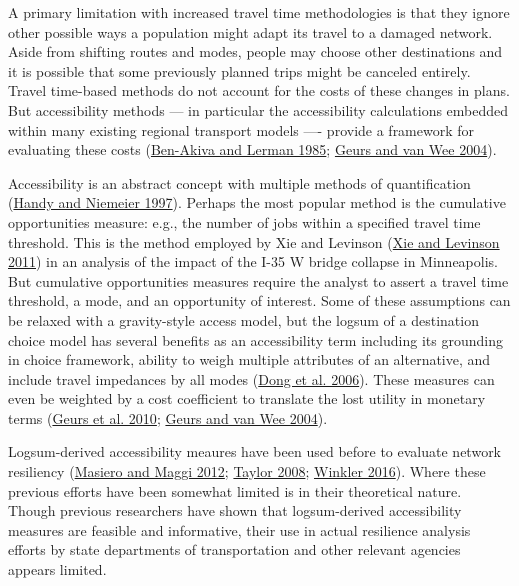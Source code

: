 \documentclass[]{ascelike-new}
\begin{document}
A primary limitation with increased travel time methodologies is that
they ignore other possible ways a population might adapt its travel to a
damaged network. Aside from shifting routes and modes, people may choose
other destinations and it is possible that some previously planned trips
might be canceled entirely. Travel time-based methods do not account for
the costs of these changes in plans. But accessibility methods --- in
particular the accessibility calculations embedded within many existing
regional transport models ---- provide a framework for evaluating these
costs (\protect\hyperlink{ref-ben-akiva1985}{Ben-Akiva and Lerman 1985};
\protect\hyperlink{ref-geurs2004}{Geurs and van Wee 2004}).

Accessibility is an abstract concept with multiple methods of
quantification (\protect\hyperlink{ref-handy1997}{Handy and Niemeier
1997}). Perhaps the most popular method is the cumulative opportunities
measure: e.g., the number of jobs within a specified travel time
threshold. This is the method employed by Xie and Levinson
(\protect\hyperlink{ref-xie2011}{Xie and Levinson 2011}) in an analysis
of the impact of the I-35 W bridge collapse in Minneapolis. But
cumulative opportunities measures require the analyst to assert a travel
time threshold, a mode, and an opportunity of interest. Some of these
assumptions can be relaxed with a gravity-style access model, but the
logsum of a destination choice model has several benefits as an
accessibility term including its grounding in choice framework, ability
to weigh multiple attributes of an alternative, and include travel
impedances by all modes (\protect\hyperlink{ref-dong2006}{Dong et al.
2006}). These measures can even be weighted by a cost coefficient to
translate the lost utility in monetary terms
(\protect\hyperlink{ref-geurs2010}{Geurs et al. 2010};
\protect\hyperlink{ref-geurs2004}{Geurs and van Wee 2004}).

Logsum-derived accessibility meaures have been used before to evaluate
network resiliency (\protect\hyperlink{ref-masiero2012}{Masiero and
Maggi 2012}; \protect\hyperlink{ref-taylor2008}{Taylor 2008};
\protect\hyperlink{ref-winkler2016}{Winkler 2016}). Where these previous
efforts have been somewhat limited is in their theoretical nature.
Though previous researchers have shown that logsum-derived accessibility
measures are feasible and informative, their use in actual resilience
analysis efforts by state departments of transportation and other
relevant agencies appears limited.

\end{document}
